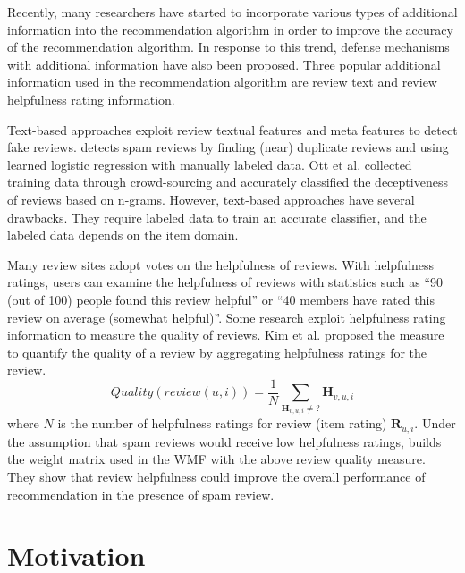 \documentclass[master,english,final]{kaist-ucs}
\begin{document}
Recently, many researchers have started to incorporate various types of additional information into the recommendation algorithm in order to improve the accuracy of the recommendation algorithm.
In response to this trend, defense mechanisms with additional information have also been proposed.
Three popular additional information used in the recommendation algorithm are review text and review helpfulness rating information.

Text-based approaches \cite{text_duplicate, text_crowd,text_opinion_summarization,naive_helpfulness} exploit review textual features and meta features to detect fake reviews.
\cite{text_duplicate} detects spam reviews by finding (near) duplicate reviews and using learned logistic regression with manually labeled data.
Ott et al. \cite{text_crowd} collected training data through crowd-sourcing and accurately classified the deceptiveness of reviews based on n-grams.
However, text-based approaches have several drawbacks.
They require labeled data to train an accurate classifier, and the labeled data depends on the item domain.

Many review sites adopt votes on the helpfulness of reviews.
With helpfulness ratings, users can examine the helpfulness of reviews with statistics such as “90 (out of 100) people found this review helpful” or “40 members have rated this review on average (somewhat helpful)”.
Some research \cite{naive_helpfulness,RQMF} exploit helpfulness rating information to measure the quality of reviews.
Kim et al. \cite{naive_helpfulness} proposed the measure to quantify the quality of a review by aggregating helpfulness ratings for the review.
\begin{equation} \label{eq:naive_quality}
Quality(review(u,i))=\frac{1} {N} \sum_{\bm{H}_{v,u,i} \neq ?} \bm{H}_{v,u,i}
\end{equation}
where $N$ is the number of helpfulness ratings for review (item rating) $\bm{R}_{u,i}$.
Under the assumption that spam reviews would receive low helpfulness ratings, \cite{RQMF} builds the weight matrix used in the WMF with the above review quality measure.
They show that review helpfulness could improve the overall performance of recommendation in the presence of spam review.

\chapter{Motivation}
\end{document}
